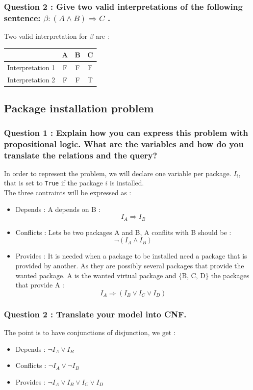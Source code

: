 \documentclass[a4paper,10pt]{article}
\begin{document}
\subsubsection*{Question 2 : Give two valid interpretations of the following sentence: $\beta : (A \wedge B) \Rightarrow C$ .}
Two valid interpretation for $\beta$ are :
\begin{center}
\begin{tabular}{|c|c|c|c|}
  \hline
   & \textbf{A} & \textbf{B} & \textbf{C} \\
  \hline
  Interpretation 1 & F & F & F \\
  \hline
  Interpretation 2 & F & F & T \\
  \hline
\end{tabular}
\end{center}
\subsection{Package installation problem}
\subsubsection{Question 1 : Explain how you can express this problem with propositional logic. What are the variables and how do you translate the relations and the query?}
In order to represent the problem, we will declare one variable per package. $I_{i}$, that is set to \texttt{True} if the package $i$ is installed.\\
The three contraints will be expressed as :
\begin{itemize}
  \item Depends : A depends on B : \\
  $$I_{A} \Rightarrow I_{B}$$
  \item Conflicts : Lets be two packages A and B, A conflits with B should be : \\
  $$\neg (I_{A} \wedge I_{B})$$
  \item Provides : It is needed when a package to be installed need a package that is provided by another. As they are possibly several packages that provide the wanted package. A is the wanted virtual package and \{B, C, D\} the packages that provide A : \\
  $$I_{A} \Rightarrow (I_{B} \vee I_{C} \vee I_{D})$$
\end{itemize}

\subsubsection{Question 2 : Translate your model into CNF.}
The point is to have conjunctions of disjunction, we get :
\begin{itemize}
  \item Depends : $\neg I_{A} \vee I_{B}$
  \item Conflicts : $\neg I_{A} \vee \neg I_{B}$
  \item Provides : $\neg I_{A} \vee I_{B} \vee I_{C} \vee I_{D}$
\end{itemize}
\end{document}
